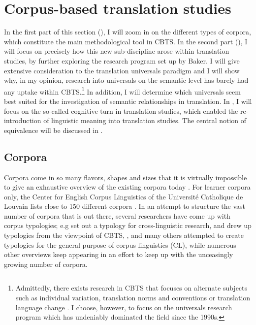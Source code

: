 \section{Corpus-based translation studies}
\label{sec:2.2}
In the first part of this section (), I will zoom in on the different types of corpora, which constitute the main methodological tool in CBTS. In the second part (), I will focus on precisely how this new sub-discipline arose within translation studies, by further exploring the research program set up by Baker. I will give extensive consideration to the translation universals paradigm and I will show why, in my opinion, research into universals on the semantic level has barely had any uptake within CBTS.\footnote{Admittedly, there exists research in CBTS that focuses on alternate subjects such as individual variation, translation norms and conventions or translation language change \citep[21]{zanettin_corpus_2013}. I choose, however, to focus on the universals research program which has undeniably dominated the field since the 1990s.} In addition, I will determine which universals seem best suited for the investigation of semantic relationships in translation. In , I will focus on the so-called cognitive turn in translation studies, which enabled the re-introduction of linguistic meaning into translation studies. The central notion of equivalence will be discussed in .\hypertarget{Corpora}{}

\subsection{Corpora}
\label{sec:2.2.1}  
Corpora come in so many flavors, shapes and sizes that it is virtually impossible to give an exhaustive overview of the existing corpora today \citep{mcenery_corpus_2012}. For learner corpora only, the Center for English Corpus Linguistics of the Université Catholique de Louvain lists close to 150 different corpora \citep{hiligsmann_learner_2015}. In an attempt to structure the vast number of corpora that is out there, several researchers have come up with corpus typologies; e.g \citet{johansson_role_1998} set out a typology for cross-linguistic research, \citet{baker_corpora_1995} and \citet{laviosa_corpus-based_2002} drew up typologies from the viewpoint of CBTS, \citet{brown_corpora_2006}, \citet{mccarthy_what_2010} and many others attempted to create typologies for the general purpose of corpus linguistics (CL), while numerous other overviews keep appearing in an effort to keep up with the unceasingly growing number of corpora.

